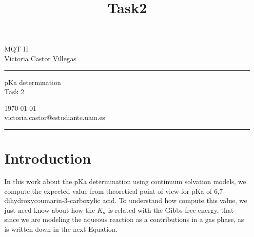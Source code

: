 {\setlength{\parindent}{0pt}
\title{Task2} %
\fancyhead[C]{}
\begin{minipage}{0.295\textwidth} %
\raggedright
MQT II\\ %
\footnotesize %
Victoria Castor Villegas %
\medskip\hrule
\end{minipage}
\begin{minipage}{0.4\textwidth} %
\centering 
\large %
pKa determination\\ %
\normalsize %
Task 2\\ %
\end{minipage}
\begin{minipage}{0.295\textwidth} %
\raggedleft
\today\\ %
\footnotesize %
victoria.castor@estudiante.uam.es%
\medskip\hrule
\end{minipage}
}

\section{\textbf{Introduction}}

In this work about the pKa determination using continuum solvation
models, we compute the expected value from theoretical point of view
for pKa of 6,7-dihydroxycoumarin-3-carboxylic acid.
To understand how compute this value, we just need know about how
the $K_a$ is related with the Gibbs free energy, that since we are
modeling the aqueous reaction as a contributions in a gas phase, as
is written down in the next Equation.

\centerline{}

